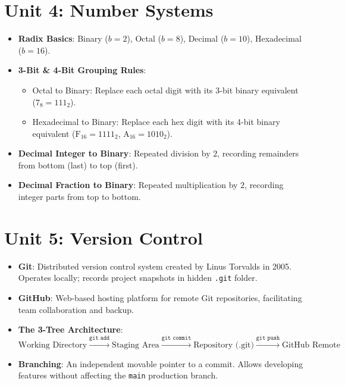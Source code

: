 \section*{Unit 4: Number Systems}
\begin{itemize}[leftmargin=6mm]
    \item \textbf{Radix Basics}: Binary ($b=2$), Octal ($b=8$), Decimal ($b=10$), Hexadecimal ($b=16$).
    \item \textbf{3-Bit \& 4-Bit Grouping Rules}:
    \begin{itemize}
        \item Octal to Binary: Replace each octal digit with its 3-bit binary equivalent ($7_8 = 111_2$).
        \item Hexadecimal to Binary: Replace each hex digit with its 4-bit binary equivalent ($\text{F}_{16} = 1111_2$, $\text{A}_{16} = 1010_2$).
    \end{itemize}
    \item \textbf{Decimal Integer to Binary}: Repeated division by $2$, recording remainders from bottom (last) to top (first).
    \item \textbf{Decimal Fraction to Binary}: Repeated multiplication by $2$, recording integer parts from top to bottom.
\end{itemize}

\section*{Unit 5: Version Control}
\begin{itemize}[leftmargin=6mm]
    \item \textbf{Git}: Distributed version control system created by Linus Torvalds in 2005. Operates locally; records project snapshots in hidden \texttt{.git} folder.
    \item \textbf{GitHub}: Web-based hosting platform for remote Git repositories, facilitating team collaboration and backup.
    \item \textbf{The 3-Tree Architecture}:
    \[
    \text{Working Directory} \xrightarrow{\texttt{git add}} \text{Staging Area} \xrightarrow{\texttt{git commit}} \text{Repository (.git)} \xrightarrow{\texttt{git push}} \text{GitHub Remote}
    \]
    \item \textbf{Branching}: An independent movable pointer to a commit. Allows developing features without affecting the \texttt{main} production branch.
\end{itemize}

